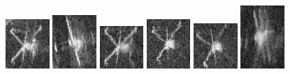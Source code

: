 \begin{figure}
    \includegraphics[width=0.15\textwidth]{chapters/images/dataset/all-class-images/valve/valve-96.jpg}
    \includegraphics[width=0.15\textwidth]{chapters/images/dataset/all-class-images/valve/valve-26.jpg}
    \includegraphics[width=0.15\textwidth]{chapters/images/dataset/all-class-images/valve/valve-173.jpg}
    \includegraphics[width=0.15\textwidth]{chapters/images/dataset/all-class-images/valve/valve-107.jpg}
    \includegraphics[width=0.15\textwidth]{chapters/images/dataset/all-class-images/valve/valve-201.jpg}
    \includegraphics[width=0.15\textwidth]{chapters/images/dataset/all-class-images/valve/valve-14.jpg}
    

\end{figure}
